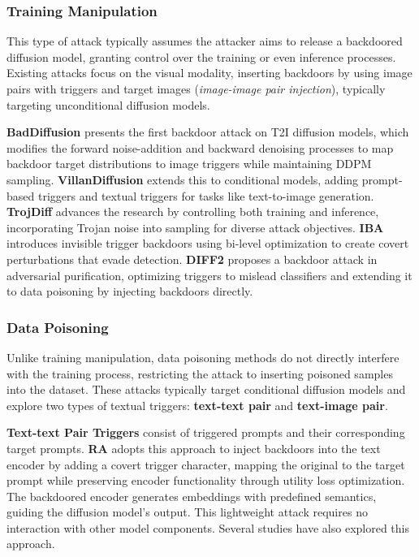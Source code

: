 \subsubsection{Training Manipulation}
This type of attack typically assumes the attacker aims to release a backdoored diffusion model, granting control over the training or even inference processes. Existing attacks focus on the visual modality, inserting backdoors by using image pairs with triggers and target images (\emph{image-image pair injection}), typically targeting unconditional diffusion models.

\textbf{BadDiffusion} \cite{chou2023backdoor} presents the first backdoor attack on T2I diffusion models, which modifies the forward noise-addition and backward denoising processes to map backdoor target distributions to image triggers while maintaining DDPM sampling. \textbf{VillanDiffusion} \cite{chou2024villandiffusion} extends this to conditional models, adding prompt-based triggers and textual triggers for tasks like text-to-image generation. \textbf{TrojDiff} \cite{chen2023trojdiff} advances the research by controlling both training and inference, incorporating Trojan noise into sampling for diverse attack objectives. \textbf{IBA\cite{li2024invisible}} introduces invisible trigger backdoors using bi-level optimization to create covert perturbations that evade detection. \textbf{DIFF2} \cite{li2024watch} proposes a backdoor attack in adversarial purification, optimizing triggers to mislead classifiers and extending it to data poisoning by injecting backdoors directly.


\subsubsection{Data Poisoning}
Unlike training manipulation, data poisoning methods do not directly interfere with the training process, restricting the attack to inserting poisoned samples into the dataset. These attacks typically target conditional diffusion models and explore two types of textual triggers: \textbf{text-text pair} and \textbf{text-image pair}.


\textbf{Text-text Pair Triggers} consist of triggered prompts and their corresponding target prompts.  \textbf{RA} \cite{struppek2023rickrolling} adopts this approach to inject backdoors into the text encoder by adding a covert trigger character, mapping the original to the target prompt while preserving encoder functionality through utility loss optimization. The backdoored encoder generates embeddings with predefined semantics, guiding the diffusion model’s output. This lightweight attack requires no interaction with other model components. Several studies \cite{struppek2023rickrolling, vice2024bagm, huang2023zero, huang2024personalization} have also explored this approach. 

